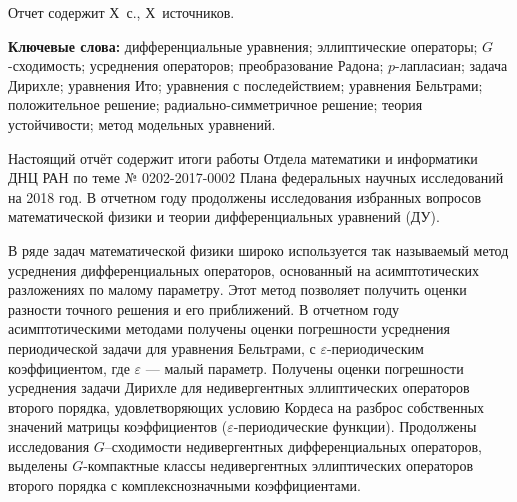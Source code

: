 \Referat %

Отчет содержит Х~с., Х~источников.%

\bigskip
\textbf{ Ключевые
	слова:}
дифференциальные уравнения;
эллиптические операторы;
$G$-сходи\-мость; %
усреднения операторов;
преобразование Радона;
$p$-лапласиан;
задача Дирихле;
уравнения Ито;
уравнения с последействием;
уравнения Бельтрами;
положительное решение;
радиально-симметричное решение;
теория устойчивости;
метод модельных уравнений.


\bigskip



Настоящий отчёт содержит итоги работы Отдела математики и информатики ДНЦ РАН по теме № 0202-2017-0002  Плана федеральных научных исследований на 2018 год.
В отчетном году продолжены исследования избранных вопросов математической физики и теории дифференциальных уравнений (ДУ).

В ряде задач математической физики широко используется так называемый метод усреднения дифференциальных операторов, основанный на асимптотических разложениях по малому параметру. Этот метод позволяет получить оценки разности точного решения и его приближений.
В отчетном году асимптотическими методами получены оценки погрешности усреднения периодической задачи для уравнения Бельтрами, с $\varepsilon$-периодическим коэффициентом, где $\varepsilon$  --- малый параметр.
Получены оценки погрешности усреднения задачи Дирихле для недивергентных эллиптических операторов второго порядка, удовлетворяющих условию Кордеса на разброс собственных значений матрицы коэффициентов ($\varepsilon$-периодические функции).
Продолжены исследования  $G$--сходимости недивергентных дифференциальных операторов, выделены $G$-компактные классы недивергентных эллиптических операторов второго порядка с комплекснозначными коэффициентами.








